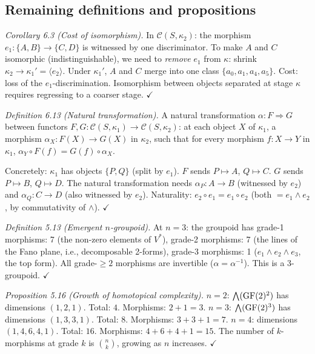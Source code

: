 \subsection{Remaining definitions and propositions}

\emph{Corollary 6.3 (Cost of isomorphism).}
In $\mathcal{C}(S, \kappa_2)$: the morphism
$e_1: \{A,B\} \to \{C,D\}$ is witnessed by one
discriminator. To make $A$ and $C$ isomorphic
(indistinguishable), we need to \emph{remove} $e_1$
from $\kappa$: shrink $\kappa_2 \to \kappa_1' =
\langle e_2 \rangle$. Under $\kappa_1'$, $A$ and $C$
merge into one class $\{a_0, a_1, a_4, a_5\}$. Cost:
loss of the $e_1$-discrimination. Isomorphism between
objects separated at stage $\kappa$ requires regressing
to a coarser stage. $\checkmark$

\emph{Definition 6.13 (Natural transformation).}
A natural transformation $\alpha: F \Rightarrow G$
between functors $F, G: \mathcal{C}(S, \kappa_1) \to
\mathcal{C}(S, \kappa_2)$: at each object $X$ of
$\kappa_1$, a morphism $\alpha_X: F(X) \to G(X)$ in
$\kappa_2$, such that for every morphism $f: X \to Y$
in $\kappa_1$, $\alpha_Y \circ F(f) = G(f) \circ
\alpha_X$.

Concretely: $\kappa_1$ has objects $\{P, Q\}$ (split
by $e_1$). $F$ sends $P \mapsto A$, $Q \mapsto C$.
$G$ sends $P \mapsto B$, $Q \mapsto D$. The natural
transformation needs $\alpha_P: A \to B$ (witnessed by
$e_2$) and $\alpha_Q: C \to D$ (also witnessed by $e_2$).
Naturality: $e_2 \circ e_1 = e_1 \circ e_2$ (both
$= e_1 \wedge e_2$, by commutativity of $\wedge$).
$\checkmark$

\emph{Definition 5.13 (Emergent $n$-groupoid).}
At $n = 3$: the groupoid has
grade-1 morphisms: 7 (the non-zero elements of $V^*$),
grade-2 morphisms: 7 (the lines of the Fano plane,
i.e., decomposable 2-forms),
grade-3 morphisms: 1 ($e_1 \wedge e_2 \wedge e_3$,
the top form).
All grade-$\geq 2$ morphisms are invertible
($\alpha = \alpha^{-1}$). This is a 3-groupoid.
$\checkmark$

\emph{Proposition 5.16 (Growth of homotopical complexity).}
$n = 2$: $\bigwedge(\operatorname{GF}(2)^2)$ has dimensions
$(1, 2, 1)$. Total: $4$. Morphisms: $2 + 1 = 3$.
$n = 3$: $\bigwedge(\operatorname{GF}(2)^3)$ has dimensions
$(1, 3, 3, 1)$. Total: $8$. Morphisms: $3 + 3 + 1 = 7$.
$n = 4$: dimensions $(1, 4, 6, 4, 1)$. Total: $16$.
Morphisms: $4 + 6 + 4 + 1 = 15$.
The number of $k$-morphisms at grade $k$ is
$\binom{n}{k}$, growing as $n$ increases. $\checkmark$

